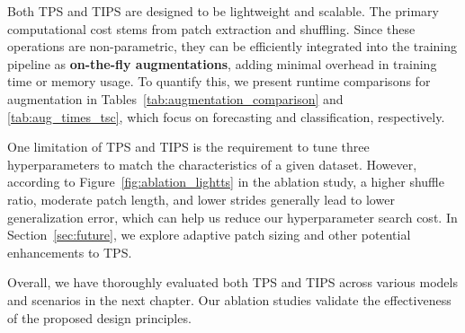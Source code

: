 Both TPS and TIPS are designed to be lightweight and scalable. The primary computational cost stems from patch extraction and shuffling. Since these operations are non-parametric, they can be efficiently integrated into the training pipeline as \textbf{on-the-fly augmentations}, adding minimal overhead in training time or memory usage. To quantify this, we present runtime comparisons for augmentation in Tables~\ref{tab:augmentation_comparison} and \ref{tab:aug_times_tsc}, which focus on forecasting and classification, respectively.

One limitation of TPS and TIPS is the requirement to tune three hyperparameters to match the characteristics of a given dataset. However, according to Figure~\ref{fig:ablation_lightts} in the ablation study, a higher shuffle ratio, moderate patch length, and lower strides generally lead to lower generalization error, which can help us reduce our hyperparameter search cost. In Section~\ref{sec:future}, we explore adaptive patch sizing and other potential enhancements to TPS.

Overall, we have thoroughly evaluated both TPS and TIPS across various models and scenarios in the next chapter. Our ablation studies validate the effectiveness of the proposed design principles. 





